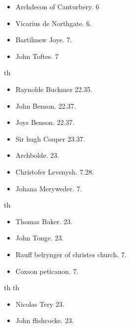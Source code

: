 \documentclass[12pt, a4paper]{book}
\begin{document}
			
				\begin{itemize}
					\item[]Archdecon of Canturbery. 6
					\item[]Vicarius de Northgate. 6.
					\item[]Bartilmew Joye. 7.
					\item[]John Toftes. 7
				\end{itemize}
				th
				\begin{itemize}
					\item[]Raynolde Buckmer 22.35.
					\item[]John Benson. 22.37.
					\item[]Joys Benson. 22.37.
					\item[]Sir hugh Couper 23.37.
					\item[]Archbolde. 23.
				\end{itemize}
			
			
				\begin{itemize}
					\item[]Christofer Levenysh. 7.28.
					\item[]Johana Meryweder. 7.
				\end{itemize}
				th
				\begin{itemize}
					\item[]Thomas Baker. 23.
					\item[]John Tonge. 23.
				\end{itemize}
			
			
				
				\marginpar[\vspace{0.5cm}{\textcolor{Gray}{n}}]{}
			
				\begin{itemize}
					\item[]Rauff belrynger of christes church. 7.
					\item[]Coxson peticanon. 7. 
				\end{itemize}
				th
				th
				\begin{itemize}
					\item[]Nicolas Tery 23.
					\item[]John ffishcocke. 23.
				\end{itemize}
			
			
				
				\marginpar[\vspace{0.5cm}{\textcolor{Gray}{th}}]{}
			
				
				\marginpar[\vspace{0.5cm}{\textcolor{Gray}{th n}}]{}
			
\end{document}
